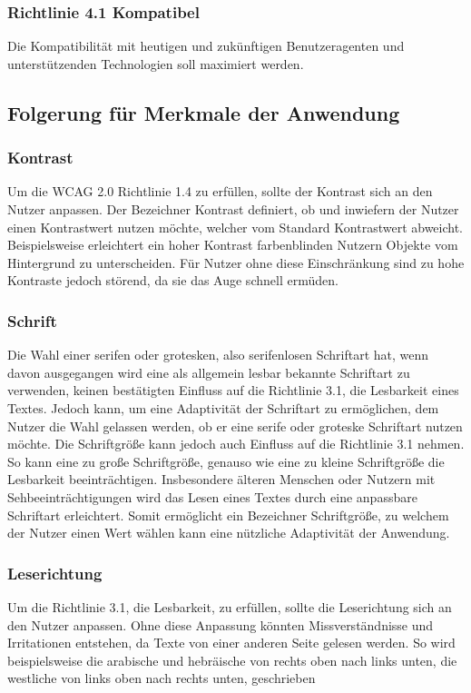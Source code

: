 \documentclass[12pt, paper=a4, bibtotoc, toc=listof, headsepline=true]{scrreprt}
\begin{document}
			\subsubsection{Richtlinie 4.1 Kompatibel}
			Die Kompatibilität mit heutigen und zukünftigen Benutzeragenten und unterstützenden Technologien soll maximiert werden.			
			\cite[vgl.]{wcag}
		\subsection{Folgerung für Merkmale der Anwendung}
			\subsubsection{Kontrast}
			Um die \ac{WCAG 2.0} Richtlinie 1.4 zu erfüllen, sollte der Kontrast sich an den Nutzer anpassen. Der Bezeichner Kontrast definiert, ob und inwiefern der Nutzer einen Kontrastwert nutzen möchte, welcher vom Standard Kontrastwert abweicht. Beispielsweise erleichtert ein hoher Kontrast farbenblinden Nutzern Objekte vom Hintergrund zu unterscheiden. Für Nutzer ohne diese Einschränkung sind zu hohe Kontraste jedoch störend, da sie das Auge schnell ermüden.\cite[vgl S.234]{balzert2009webdesign}
			\subsubsection{Schrift}
			Die Wahl einer serifen oder grotesken, also serifenlosen Schriftart hat, wenn davon ausgegangen wird eine als allgemein lesbar bekannte Schriftart zu verwenden, keinen bestätigten Einfluss auf die Richtlinie 3.1, die Lesbarkeit eines Textes.\cite[vgl. S.157-161]{barrierefreiheit} Jedoch kann, um eine Adaptivität der Schriftart zu ermöglichen, dem Nutzer die Wahl gelassen werden, ob er eine serife oder groteske Schriftart nutzen möchte.
			Die Schriftgröße kann jedoch auch Einfluss auf die Richtlinie 3.1 nehmen. So kann eine zu große Schriftgröße, genauso wie eine zu kleine Schriftgröße die Lesbarkeit beeinträchtigen. Insbesondere älteren Menschen oder Nutzern mit Sehbeeinträchtigungen wird das Lesen eines Textes durch eine anpassbare Schriftart erleichtert.\cite[vgl. S.152]{barrierefreiheit} Somit ermöglicht ein Bezeichner Schriftgröße, zu welchem der Nutzer einen Wert wählen kann eine nützliche Adaptivität der Anwendung. 
			\subsubsection{Leserichtung}
			\label{ref:lesRic}
			Um die Richtlinie 3.1, die Lesbarkeit, zu erfüllen, sollte die Leserichtung sich an den Nutzer anpassen. Ohne diese Anpassung könnten Missverständnisse und Irritationen entstehen, da Texte von einer anderen Seite gelesen werden. So wird beispielsweise die arabische und hebräische von rechts oben nach links unten, die westliche von links oben nach rechts unten, geschrieben  \cite[vgl S.148]{emrich2013interkulturelles}
			
\end{document}
